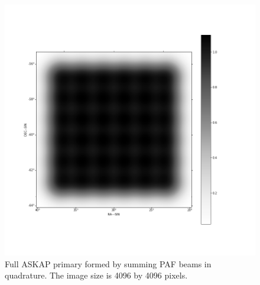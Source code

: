 \documentclass[11pt,a4paper,variablewidth]{article}
\begin{document}
\begin{figure}[h]
  \centering
  \includegraphics[width=\textwidth]{./pngs/full_askap_pb_4096.png}
  \caption{Full ASKAP primary formed by summing PAF beams in quadrature. The image size is 4096 by 4096 pixels.}
  \label{fig:full_askap_pb}
\end{figure}
\end{document}
